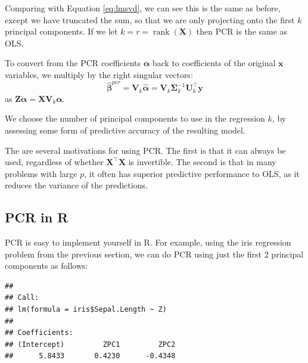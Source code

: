 \documentclass[
]{book}
\newenvironment{Shaded}{\begin{snugshade}}{\end{snugshade}}
\newcommand{\AttributeTok}[1]{\textcolor[rgb]{0.13,0.29,0.53}{#1}}
\newcommand{\CommentTok}[1]{\textcolor[rgb]{0.56,0.35,0.01}{\textit{#1}}}
\newcommand{\ConstantTok}[1]{\textcolor[rgb]{0.56,0.35,0.01}{#1}}
\newcommand{\DecValTok}[1]{\textcolor[rgb]{0.00,0.00,0.81}{#1}}
\newcommand{\FunctionTok}[1]{\textcolor[rgb]{0.13,0.29,0.53}{\textbf{#1}}}
\newcommand{\NormalTok}[1]{#1}
\newcommand{\OtherTok}[1]{\textcolor[rgb]{0.56,0.35,0.01}{#1}}
\newcommand{\SpecialCharTok}[1]{\textcolor[rgb]{0.81,0.36,0.00}{\textbf{#1}}}
\theoremstyle{definition}
\theoremstyle{definition}
\theoremstyle{definition}
\theoremstyle{definition}
\theoremstyle{remark}
\begin{document}
Comparing with Equation \eqref{eq:lmsvd}, we can see this is the same as before, except we have truncated the sum, so that we are only projecting onto the first \(k\) principal components. If we let \(k=r = \operatorname{rank}(\mathbf X)\) then PCR is the same as OLS.

To convert from the PCR coefficients \(\boldsymbol \alpha\) back to coefficients of the original \(\mathbf x\) variables, we multiply by the right singular vectors:
\[\hat{\boldsymbol \beta}^{pcr} = \mathbf V_k \hat{\boldsymbol \alpha} = \mathbf V_k \boldsymbol{\Sigma}_k^{-1} \mathbf U_k^\top \mathbf y\]
as \(\mathbf Z\boldsymbol \alpha= \mathbf X\mathbf V_k \boldsymbol \alpha\).

We choose the number of principal components to use in the regression \(k\), by assessing some form of predictive accuracy of the resulting model.

The are several motivations for using PCR. The first is that it can always be used, regardless of whether \(\mathbf X^\top\mathbf X\) is invertible. The second is that in many problems with large \(p\), it often has superior predictive performance to OLS, as it reduces the variance of the predictions.

\hypertarget{pcr-in-r}{%
\subsection{PCR in R}\label{pcr-in-r}}

PCR is easy to implement yourself in R. For example, using the iris regression problem from the previous section, we can do PCR using just the first 2 principal components as follows:

\begin{Shaded}
\end{Shaded}

\begin{verbatim}
## 
## Call:
## lm(formula = iris$Sepal.Length ~ Z)
## 
## Coefficients:
## (Intercept)         ZPC1         ZPC2  
##      5.8433       0.4230      -0.4348
\end{verbatim}
\end{document}
